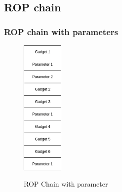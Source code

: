 \documentclass[11pt]{beamer}
\begin{document}
\subsection{ROP chain}
\begin{frame}
    \frametitle{ROP chain with parameters}
    \begin{figure}[h]
        \caption{ROP Chain with parameter}
        \centering
        \includegraphics[width=0.18\textwidth]{gadgetstack.png}\label{gadget2}
    \end{figure}
\end{frame}
\end{document}
